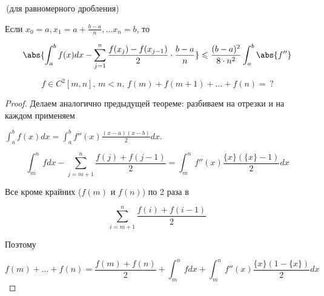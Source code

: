 \follow \,(для равномерного дробления)

Если $x_0 = a, x_1 = a + \frac{b - a}{n}, ... x_n = b$, то

\[
    \abs{\int_a^b f(x) dx - \sum_{j = 1} ^ n \frac{f(x_j) - f(x_{j - 1})}{2} \cdot \frac{b - a}{n}}  \leqslant \frac{(b - a) ^ 2}{8 \cdot n^2} \int_a^b \abs{f''}
\]

\quad 

\begin{theorem}
    \[
        f \in C^2[m, n], \, m < n, \, f(m) + f(m + 1) + ... + f(n) = \, ?
    \]
\end{theorem}

\begin{proof}

    Делаем аналогично предыдущей теореме: разбиваем на отрезки и на каждом применяем 

    $
        \int_a^b f(x) dx = \int_a^b f''(x) \frac{(x - a)(x - b)}{2} dx
    $.

    \[
        \int_m^n f dx - \sum_{j = m + 1}^n \frac{f(j) + f(j - 1)}{2}  = \int_m^n f''(x) \frac{\{x \} (\{x \} - 1)}{2} dx
    \]

    Все кроме крайних ($f(m) $ и $f(n)$) по 2 раза в 

    \[
        \sum_{i = m + 1}^n \frac{f(i) + f(i - 1)}{2}
    \] 

    Поэтому 

    \[
        f(m) + ... + f(n) = \frac{f(m) + f(n)}{2} + \int_m^n f dx + \int_m^n f''(x) \frac{\{x\}(1 - \{x \})}{2} dx
    \]
\end{proof}

